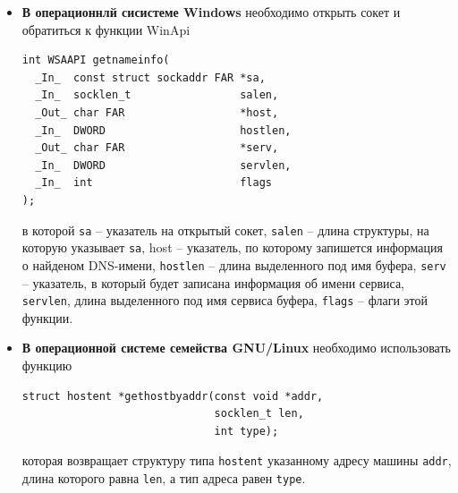 \documentclass[a4paper]{article}
\begin{document}
			\begin{itemize}
			
				\item \textbf{В операционнлй сисистеме Windows} необходимо открыть сокет и обратиться к функции WinApi
				\begin{lstlisting}					
int WSAAPI getnameinfo(
  _In_  const struct sockaddr FAR *sa,
  _In_  socklen_t                 salen,
  _Out_ char FAR                  *host,
  _In_  DWORD                     hostlen,
  _Out_ char FAR                  *serv,
  _In_  DWORD                     servlen,
  _In_  int                       flags
);
				\end{lstlisting}
				
				в которой \texttt{sa} -- указатель на открытый сокет, \texttt{salen} -- длина структуры, на которую указывает \texttt{sa}, host -- указатель, по которому запишется информация о найденом DNS-имени, \texttt{hostlen} -- длина выделенного под имя буфера, \texttt{serv} -- указатель, в который будет записана информация об имени сервиса, \texttt{servlen}, длина выделенного под имя сервиса буфера, \texttt{flags} -- флаги этой функции.
				
				\item \textbf{В операционной системе семейства GNU/Linux} необходимо использовать функцию 
				
				\begin{lstlisting}					
struct hostent *gethostbyaddr(const void *addr,
                              socklen_t len, 
                              int type);
				\end{lstlisting}
				
				которая возвращает структуру типа \texttt{hostent} указанному адресу машины \texttt{addr}, длина которого равна \texttt{len}, а тип адреса равен \texttt{type}.
				

\end{itemize}
\end{document}
